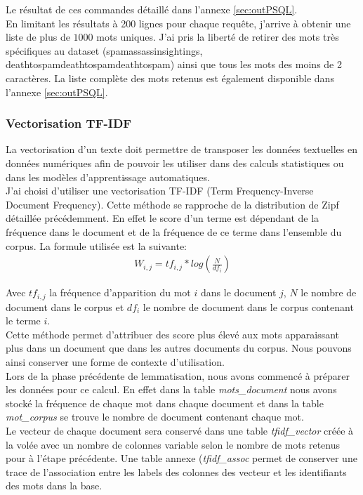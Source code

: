 \documentclass[a4paper,12pt]{article}
\begin{document}
			Le résultat de ces commandes détaillé dans l'annexe \ref{sec:outPSQL}. \\
			
			En limitant les résultats à 200 lignes pour chaque requête, j'arrive à obtenir une liste de plus de $1000$ mots uniques. J'ai pris la liberté de retirer des mots très spécifiques au dataset (spamassassinsightings, deathtospamdeathtospamdeathtospam) ainsi que tous les mots des moins de 2 caractères. La liste complète des mots retenus est également disponible dans l'annexe \ref{sec:outPSQL}.
			
			
			
		
		\subsubsection{Vectorisation TF-IDF}
			La vectorisation d'un texte doit permettre de transposer les données textuelles en données numériques afin de pouvoir les utiliser dans des calculs statistiques ou dans les modèles d'apprentissage automatiques.\\
			J'ai choisi d'utiliser une vectorisation TF-IDF\cite{ml-python} (Term Frequency-Inverse Document Frequency). Cette méthode se rapproche de la distribution de Zipf détaillée précédemment. En effet le score d'un terme est dépendant de la fréquence dans le document et de la fréquence de ce terme dans l'ensemble du corpus. La formule utilisée est la suivante:
			\begin{align*}
				W_{i,j} = tf_{i,j}*log(\frac{N}{df_{i}})
			\end{align*}
		
			Avec $tf_{i,j}$ la fréquence d'apparition du mot $i$ dans le document $j$, $N$ le nombre de document dans le corpus et $df_{i}$ le nombre de document dans le corpus contenant le terme $i$. \\
			Cette méthode permet d'attribuer des score plus élevé aux mots apparaissant plus dans un document que dans les autres documents du corpus. Nous pouvons ainsi conserver une forme de contexte d'utilisation.\\

			Lors de la phase précédente de lemmatisation, nous avons commencé à préparer les données pour ce calcul. En effet dans la table \emph{mots\_document} nous avons stocké la fréquence de chaque mot dans chaque document et dans la table \emph{mot\_corpus} se trouve le nombre de document contenant chaque mot.\\
			Le vecteur de chaque document sera conservé dans une table \emph{tfidf\_vector} créée à la volée avec un nombre de colonnes variable selon le nombre de mots retenus pour à l'étape précédente. Une table annexe (\emph{tfidf\_assoc} permet de conserver une trace de l'association entre les labels des colonnes des vecteur et les identifiants des mots dans la base.\\
			
\end{document}

